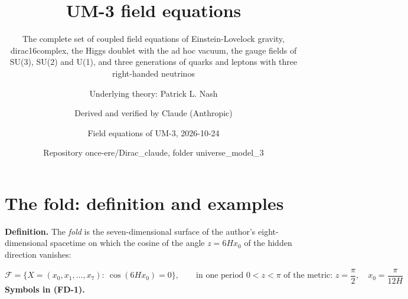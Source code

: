 \documentclass[
  10pt,
]{article}
\title{UM-3 field equations}
\subtitle{The complete set of coupled field equations of
Einstein-Lovelock gravity, dirac16complex, the Higgs doublet with the ad
hoc vacuum, the gauge fields of SU(3), SU(2) and U(1), and three
generations of quarks and leptons with three right-handed neutrinos}
\author{Underlying theory: Patrick L. Nash \and Derived and verified by
Claude (Anthropic) \and Field equations of UM-3,
2026-10-24 \and Repository once-ere/Dirac\_claude, folder
universe\_model\_3}
\date{}
\begin{document}
\maketitle

{
\hypersetup{linkcolor=}
\setcounter{tocdepth}{3}
\tableofcontents
}
\hypertarget{the-fold-definition-and-examples}{%
\section{The fold: definition and
examples}\label{the-fold-definition-and-examples}}

\textbf{Definition.} The \emph{fold} is the seven-dimensional surface of
the author's eight-dimensional spacetime on which the cosine of the
angle \(z = 6Hx_0\) of the hidden direction vanishes:

\[
\mathcal{F} = \big\{X = (x_0, x_1, \dots, x_7):\ \cos(6Hx_0) = 0\big\},\qquad
\text{in one period } 0 < z < \pi\text{ of the metric: } z = \frac{\pi}{2},\quad x_0 = \frac{\pi}{12H} \tag{FD-1}
\] \textbf{Symbols in (FD-1).}
\end{document}
